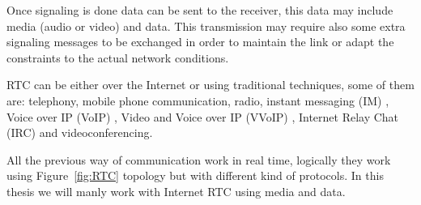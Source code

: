Once signaling is done data can be sent to the receiver, this data may include media (audio or video) and data. This transmission may require also some extra signaling messages to be exchanged in order to maintain the link or adapt the constraints to the actual network conditions. 

RTC can be either over the Internet or using traditional techniques, some of them are: telephony, mobile phone communication, radio, instant messaging (IM) , Voice over IP (VoIP) ,  Video and Voice over IP (VVoIP) , Internet Relay Chat (IRC)  and videoconferencing. 

All the previous way of communication work in real time, logically they work using Figure~\ref{fig:RTC} topology but with different kind of protocols. In this thesis we will manly work with Internet RTC using media and data.
%
%
%
%

